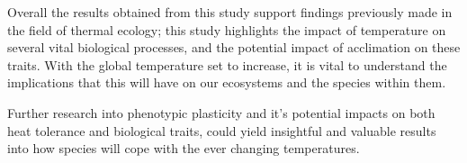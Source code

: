 \documentclass[../../Paper.tex]{subfiles}
\begin{document}
Overall the results obtained from this study support findings previously made in
the field of thermal ecology; this study highlights the impact of temperature on several
vital biological processes, and the potential impact of acclimation on these traits. With
the global temperature set to increase, it is vital to understand the implications that
this will have on our ecosystems and the species within them.

Further research into phenotypic plasticity and it's potential impacts on both heat tolerance 
and biological traits, could yield insightful and valuable results into how species will
cope with the ever changing temperatures. 
\end{document}
